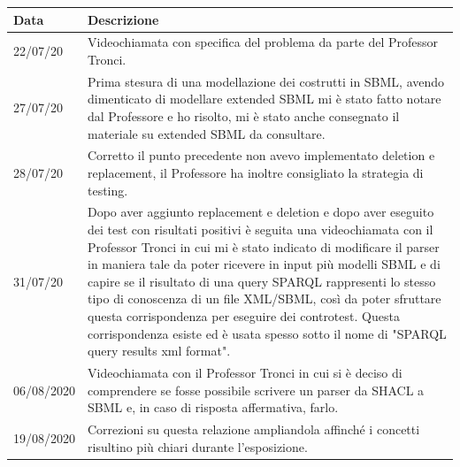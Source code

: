 \documentclass{article}
\begin{document}
\begin{longtable}{p{2cm}p{9cm}}
    \textbf{Data} & \textbf{Descrizione} \\
    \hline
    22/07/20 & Videochiamata con specifica del problema da parte del Professor Tronci. \\
    \hline
    27/07/20 & Prima stesura di una modellazione dei costrutti in SBML, avendo dimenticato di modellare extended SBML mi è stato fatto notare dal Professore e ho risolto, mi è stato anche consegnato il materiale su extended SBML da consultare. \\
    \hline
    28/07/20 & Corretto il punto precedente non avevo implementato deletion e replacement, il Professore ha inoltre consigliato la strategia di testing. \\
    \hline
    31/07/20 & Dopo aver aggiunto replacement e deletion e dopo aver eseguito dei test con risultati positivi è seguita una videochiamata con il Professor Tronci in cui mi è stato indicato di modificare il parser in maniera tale da poter ricevere in input più modelli SBML e di capire se il risultato di una query SPARQL rappresenti lo stesso tipo di conoscenza di un file XML/SBML, così da poter sfruttare questa corrispondenza per eseguire dei controtest. Questa corrispondenza esiste ed è usata spesso sotto il nome di "SPARQL query results xml format". \\
    \hline
    06/08/2020 & Videochiamata con il Professor Tronci in cui si è deciso di comprendere se fosse possibile scrivere un parser da SHACL a SBML e, in caso di risposta affermativa, farlo. \\
    \hline
    19/08/2020 & Correzioni su questa relazione ampliandola affinché i concetti risultino più chiari durante l'esposizione. \\
    \hline
\end{longtable}

\clearpage
\end{document}
